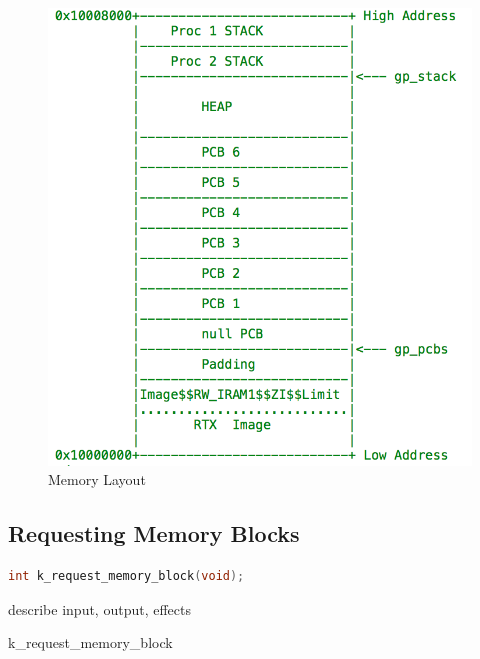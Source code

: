 \documentclass[12pt]{report}
\begin{document}
\begin{figure}
	\includegraphics{memory.png}
\caption{Memory Layout}

\end{figure}

\subsection{Requesting Memory Blocks}

\begin{minipage}{\textwidth}
\begin{lstlisting}[language=C, frame=single]
int k_request_memory_block(void);
\end{lstlisting}
\end{minipage}

describe input, output, effects

\begin{algorithm}
  \caption{k_request_memory_block}
  \begin{algorithmic}[1]
	  \EndWhile
    \EndProcedure
  \end{algorithmic}
\end{algorithm}
\end{document}
